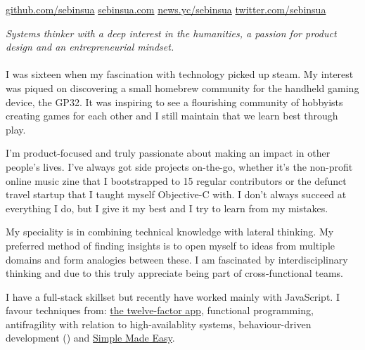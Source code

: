 \documentclass[10pt,a4paper]{article}
\begin{document}
\sloppy  %


\nobreakvspace{0.3em}  %

\noindent\href{http://github.com/sebinsua}{github.com/sebinsua}\sbull
\href{http://sebinsua.com}{sebinsua.com}\sbull
\href{https://news.ycombinator.com/user?id=lhnz}{news.yc/sebinsua}\sbull
\href{http://twitter.com/sebinsua}{twitter.com/sebinsua}\sbull

\spacedhrule{0.9em}{-0.4em}  %


\vspace{-1.3em}  %
\begin{multicols}{2}  %
\noindent \emph{Systems thinker with a deep interest in the humanities, a passion for product design and an entrepreneurial mindset.}
\\
\\
I was sixteen when my fascination with technology picked up steam. My interest was piqued on discovering a small homebrew community for the handheld gaming device, the GP32. It was inspiring to see a flourishing community of hobbyists creating games for each other and I still maintain that we learn best through play.\newline

I'm product-focused and truly passionate about making an impact in other people's lives. I've always got side projects on-the-go, whether it's the non-profit online music zine that I bootstrapped to 15 regular contributors or the defunct travel startup that I taught myself Objective-C with. I don't always succeed at everything I do, but I give it my best and I try to learn from my mistakes.\newline

My speciality is in combining technical knowledge with lateral thinking. My preferred method of finding insights is to open myself to ideas from multiple domains and form analogies between these. I am fascinated by interdisciplinary thinking and due to this truly appreciate being part of cross-functional teams.\newline

I have a full-stack skillset but recently have worked mainly with JavaScript. I favour techniques from: \href{http://12factor.net}{the twelve-factor app}, functional programming, antifragility with relation to high-availablity systems, behaviour-driven development () and \href{http://infoq.com/presentations/Simple-Made-Easy}{Simple Made Easy}.\newline

\end{multicols}
\end{document}
